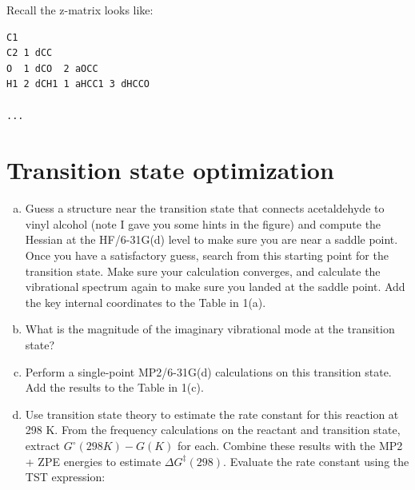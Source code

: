\documentclass[11pt]{article}
\begin{document}
Recall the z-matrix looks like:

\begin{verbatim}
C1
C2 1 dCC
O  1 dCO  2 aOCC
H1 2 dCH1 1 aHCC1 3 dHCCO

...
\end{verbatim}


\section{Transition state optimization}
\label{sec-3}
\begin{enumerate}[(a)]
\item Guess a structure near the transition state that connects acetaldehyde to vinyl alcohol (note I gave you some hints in the figure) and compute the Hessian at the HF/6-31G(d) level to make sure you are near a saddle point.  Once you have a satisfactory guess, search from this starting point for the transition state. Make sure your calculation converges, and calculate the vibrational spectrum again to make sure you landed at the saddle point. Add the key internal coordinates to the Table in 1(a).

\item What is the magnitude of the imaginary vibrational mode at the transition state?

\item Perform a single-point MP2/6-31G(d) calculations on this transition state. Add the results to the Table in 1(c).

\item Use transition state theory to estimate the rate constant for this reaction at 298 K.  From the frequency calculations on the reactant and transition state, extract \(G^{\circ}(298 K)- G( K) \) for each.  Combine these results with the MP2 + ZPE energies to estimate \( \Delta G^{\ddagger}(298) \).  Evaluate the rate constant using the TST expression:
\end{enumerate}
\end{document}
